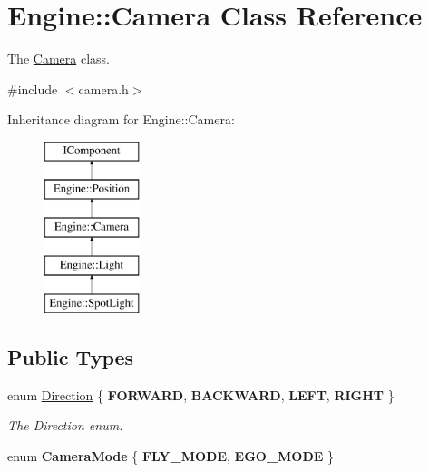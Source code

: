 \hypertarget{classEngine_1_1Camera}{}\section{Engine\+:\+:Camera Class Reference}
\label{classEngine_1_1Camera}


The \hyperlink{classEngine_1_1Camera}{Camera} class.  




{\ttfamily \#include $<$camera.\+h$>$}

Inheritance diagram for Engine\+:\+:Camera\+:\begin{figure}[H]
\begin{center}
\leavevmode
\includegraphics[height=5.000000cm]{classEngine_1_1Camera}
\end{center}
\end{figure}
\subsection*{Public Types}
\begin{DoxyCompactItemize}
\item 
enum \hyperlink{classEngine_1_1Camera_a54aed52433cefef871f5d0b294b7e87b}{Direction} \{ {\bfseries F\+O\+R\+W\+A\+R\+D}, 
{\bfseries B\+A\+C\+K\+W\+A\+R\+D}, 
{\bfseries L\+E\+F\+T}, 
{\bfseries R\+I\+G\+H\+T}
 \}\begin{DoxyCompactList}\small\item\em The Direction enum. \end{DoxyCompactList}
\item 
\hypertarget{classEngine_1_1Camera_a4362ae70fbe23d07e449fdfef964c36c}{}enum {\bfseries Camera\+Mode} \{ {\bfseries F\+L\+Y\+\_\+\+M\+O\+D\+E}, 
{\bfseries E\+G\+O\+\_\+\+M\+O\+D\+E}
 \}\label{classEngine_1_1Camera_a4362ae70fbe23d07e449fdfef964c36c}

\end{DoxyCompactItemize}
